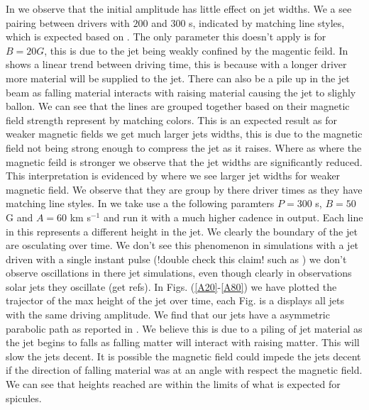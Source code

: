 \par In  we observe that the initial amplitude has little effect on jet widths. We a see pairing between drivers with $200$ and $300$ s, indicated by matching line styles, which is expected based on . The only parameter this doesn't apply is for $B=20 G$, this is due to the jet being weakly confined by the magentic feild. In  shows a linear trend between driving time, this is because with a longer driver more material will be supplied to the jet. There can also be a pile up in the jet beam as falling material interacts with raising material causing the jet to slighly ballon. We can see that the lines are grouped together based on their magnetic field strength represent by matching colors. This is an expected result as for weaker magnetic fields we get much larger jets widths, this is due to the magnetic field not being strong enough to compress the jet as it raises. Where as where the magnetic feild is stronger we observe that the jet widths are significantly reduced. This interpretation is evidenced by  where we see larger jet widths for weaker magnetic field. We observe that they are group by there driver times as they have matching line styles. In  we take use a the following paramters $P=300$ s, $B=50$ G and $A=60$ km s$^{-1}$ and run it with a much higher cadence in output. Each line in this  represents a different height in the jet. We clearly the boundary of the jet are osculating over time. We don't see this phenomenon in simulations with a jet driven with a single instant pulse (!double check this claim! such as \citep{kuz2017ApJ,Singh2019}) we don't observe oscillations in there jet simulations, even though clearly in observations solar jets they oscillate (get refs). In Figs. (\ref{A20}-\ref{A80}) we have plotted the trajector of the max height of the jet over time, each Fig. is a displays all jets with the same driving amplitude. We find that our jets have a asymmetric parabolic path as reported in \cite{Singh2019}. We believe this is due to a piling of jet material as the jet begins to falls as falling matter will interact with raising matter. This will slow the jets decent. It is possible the magnetic field could impede the jets decent if the direction of falling material was at an angle with respect the magnetic field. We can see that heights reached are within the limits of what is expected for spicules. 
